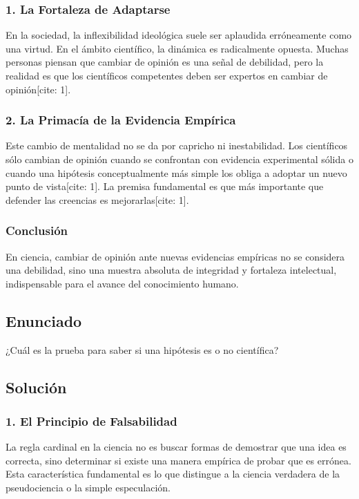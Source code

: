 \documentclass[12pt, a4paper]{article}
\begin{document}
\subsubsection*{1. La Fortaleza de Adaptarse}
En la sociedad, la inflexibilidad ideológica suele ser aplaudida erróneamente como una virtud. En el ámbito científico, la dinámica es radicalmente opuesta. Muchas personas piensan que cambiar de opinión es una señal de debilidad, pero la realidad es que los científicos competentes deben ser expertos en cambiar de opinión[cite: 1].

\subsubsection*{2. La Primacía de la Evidencia Empírica}
Este cambio de mentalidad no se da por capricho ni inestabilidad. Los científicos sólo cambian de opinión cuando se confrontan con evidencia experimental sólida o cuando una hipótesis conceptualmente más simple los obliga a adoptar un nuevo punto de vista[cite: 1]. La premisa fundamental es que más importante que defender las creencias es mejorarlas[cite: 1].

\subsubsection*{Conclusión}
En ciencia, cambiar de opinión ante nuevas evidencias empíricas no se considera una debilidad, sino una muestra absoluta de integridad y fortaleza intelectual, indispensable para el avance del conocimiento humano.

\newpage

\subsection*{Enunciado}
¿Cuál es la prueba para saber si una hipótesis es o no científica?

\subsection*{Solución}

\subsubsection*{1. El Principio de Falsabilidad}
La regla cardinal en la ciencia no es buscar formas de demostrar que una idea es correcta, sino determinar si existe una manera empírica de probar que es errónea. Esta característica fundamental es lo que distingue a la ciencia verdadera de la pseudociencia o la simple especulación.
\end{document}
